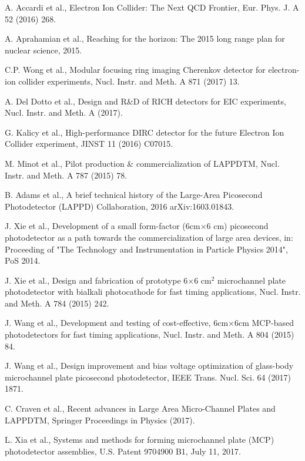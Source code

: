 \documentclass[preprint,5p]{elsarticle}
\begin{document}
  

\begin{thebibliography}{99}

A. Accardi et al., Electron Ion Collider: The Next QCD Frontier, Eur. Phys. J. A 52 (2016) 268.

A. Aprahamian et al., Reaching for the horizon: The 2015 long range plan for nuclear science, 2015. 

C.P. Wong et al., Modular focusing ring imaging Cherenkov detector for electron-ion collider experiments, Nucl. Instr. and Meth. A 871 (2017) 13.

A. Del Dotto et al., Design and R{\&}D of RICH detectors for EIC experiments, Nucl. Instr. and Meth. A (2017).

G. Kalicy et al., High-performance DIRC detector for the future Electron Ion Collider experiment, JINST 11 (2016) C07015.

M. Minot et al., Pilot production {\&} commercialization of LAPPDTM, Nucl. Instr. and Meth. A 787 (2015) 78.

B. Adams et al., A brief technical history of the Large-Area Picosecond Photodetector (LAPPD) Collaboration, 2016 arXiv:1603.01843.

J. Xie et al., Development of a small form-factor (6cm$\times$6 cm) picosecond photodetector as a path towards the commercialization of large area devices, in: Proceeding of "The Technology and Instrumentation in Particle Physics 2014", PoS 2014.

J. Xie et al., Design and fabrication of prototype 6$\times$6 cm$^2$ microchannel plate photodetector with bialkali photocathode for fast timing applications, Nucl. Instr. and Meth. A 784 (2015) 242.

J. Wang et al., Development and testing of cost-effective, 6cm$\times$6cm MCP-based photodetectors for fast timing applications, Nucl. Instr. and Meth. A 804 (2015) 84.

J. Wang et al., Design improvement and bias voltage optimization of glass-body microchannel plate picosecond photodetector, IEEE Trans. Nucl. Sci. 64 (2017) 1871.

C. Craven et al., Recent advances in Large Area Micro-Channel Plates and LAPPDTM, Springer Proceedings in Physics (2017).

L. Xia et al., Systems and methods for forming microchannel plate (MCP) photodetector assemblies, U.S. Patent 9704900 B1, July 11, 2017.


\end{thebibliography}
\end{document}
